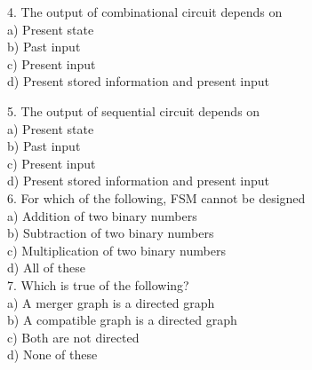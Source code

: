\documentclass[8pt]{beamer}
\begin{document}
\begin{frame}
\begin{multicols}{2}
\vspace*{0.3cm}
4. The output of combinational circuit depends
on\\
\hspace*{0.4cm} a) Present state\\
\hspace*{0.4cm} b) Past input\\
\hspace*{0.4cm} c) Present input\\
\hspace*{0.4cm} d) Present stored information and present
input\\
\end{multicols}
\end{frame}

\begin{frame}
\begin{multicols}{2}
5. The output of sequential circuit depends on\\
\hspace*{0.4cm} a) Present state\\
\hspace*{0.4cm} b) Past input\\
\hspace*{0.4cm} c) Present input\\
\hspace*{0.4cm} d) Present stored information and present
input\\

\vspace*{0.3cm}
6. For which of the following, FSM cannot be
designed\\
\hspace*{0.4cm} a) Addition of two binary numbers\\
\hspace*{0.4cm} b) Subtraction of two binary numbers\\
\hspace*{0.4cm} c) Multiplication of two binary numbers\\
\hspace*{0.4cm} d) All of these\\

\vspace*{0.3cm}
7. Which is true of the following?\\
\hspace*{0.4cm} a) A merger graph is a directed graph\\
\hspace*{0.4cm} b) A compatible graph is a directed graph\\
\hspace*{0.4cm} c) Both are not directed\\
\hspace*{0.4cm} d) None of these\\


\end{multicols}
\end{frame}
\end{document}
